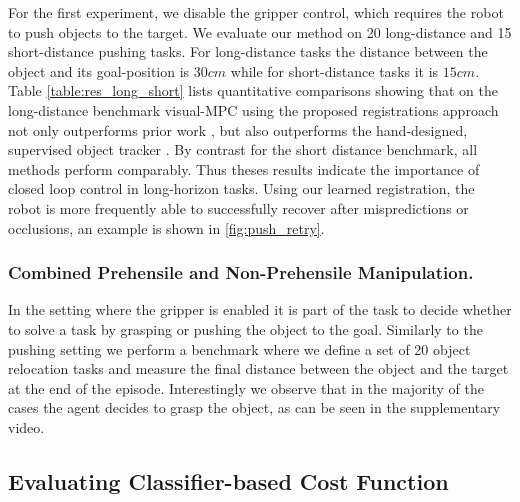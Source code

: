 For the first experiment, we disable the gripper control, which requires the robot to push objects to the target.
We evaluate our method on 20 long-distance and 15 short-distance pushing tasks. For long-distance tasks the distance between the object and its goal-position is $30cm$ while for short-distance tasks it is $15cm$. Table \ref{table:res_long_short} lists quantitative comparisons showing that on the long-distance benchmark visual-MPC using the proposed registrations approach not only outperforms prior work \cite{sna}, but also outperforms the hand-designed, supervised object tracker \cite{babenko2009visual}. By contrast for the short distance benchmark, all methods perform comparably. Thus theses results indicate the importance of closed loop control in long-horizon tasks. Using our learned registration, the robot is more frequently able to successfully recover after mispredictions or occlusions, an example is shown in \autoref{fig:push_retry}.


\subsubsection{Combined Prehensile and Non-Prehensile Manipulation.}

In the setting where the gripper is enabled it is part of the task to decide whether to solve a task by grasping or pushing the object to the goal. Similarly to the pushing setting we perform a benchmark where we define a set of 20 object relocation tasks and measure the final distance between the object and the target at the end of the episode. Interestingly we observe that in the majority of the cases the agent decides to grasp the object, as can be seen in the supplementary video.


\subsection{Evaluating Classifier-based Cost Function}

